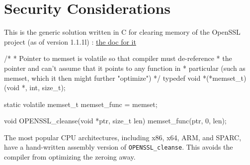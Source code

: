 \section{Security Considerations}
\label{chap:ourapproach.security}





This is the generic solution written in C for clearing memory of the OpenSSL project (as of version 1.1.1l) : \href{https://www.openssl.org/docs/man1.1.1/man3/OPENSSL_cleanse.html}{the doc for it}
\begin{ccode}
/*
 * Pointer to memset is volatile so that compiler must de-reference
 * the pointer and can't assume that it points to any function in
 * particular (such as memset, which it then might further "optimize")
 */
typedef void *(*memset_t)(void *, int, size_t);

static volatile memset_t memset_func = memset;

void OPENSSL_cleanse(void *ptr, size_t len)
{
    memset_func(ptr, 0, len);
}
\end{ccode}
The most popular CPU architectures, including x86, x64, ARM, and SPARC, have a hand-written assembly version of \texttt{OPENSSL\_cleanse}. This avoids the compiler from optimizing the zeroing away.